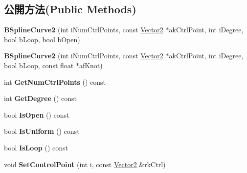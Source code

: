 \subsection*{公開方法(Public Methods)}
\begin{DoxyCompactItemize}
\item 
{\bfseries B\+Spline\+Curve2} (int i\+Num\+Ctrl\+Points, const \hyperlink{class_magnum_1_1_vector2}{Vector2} $\ast$ak\+Ctrl\+Point, int i\+Degree, bool b\+Loop, bool b\+Open)\hypertarget{class_magnum_1_1_b_spline_curve2_abb4791ad1c089a13ffb8fcb146b183be}{}\label{class_magnum_1_1_b_spline_curve2_abb4791ad1c089a13ffb8fcb146b183be}

\item 
{\bfseries B\+Spline\+Curve2} (int i\+Num\+Ctrl\+Points, const \hyperlink{class_magnum_1_1_vector2}{Vector2} $\ast$ak\+Ctrl\+Point, int i\+Degree, bool b\+Loop, const float $\ast$af\+Knot)\hypertarget{class_magnum_1_1_b_spline_curve2_aed7b4f416b57c5f6907e53eb8c702efd}{}\label{class_magnum_1_1_b_spline_curve2_aed7b4f416b57c5f6907e53eb8c702efd}

\item 
int {\bfseries Get\+Num\+Ctrl\+Points} () const \hypertarget{class_magnum_1_1_b_spline_curve2_aedea12e5c9a5103806a11dee9ab06ec9}{}\label{class_magnum_1_1_b_spline_curve2_aedea12e5c9a5103806a11dee9ab06ec9}

\item 
int {\bfseries Get\+Degree} () const \hypertarget{class_magnum_1_1_b_spline_curve2_a51881d017cd8c1a1543fb0d31e92be3d}{}\label{class_magnum_1_1_b_spline_curve2_a51881d017cd8c1a1543fb0d31e92be3d}

\item 
bool {\bfseries Is\+Open} () const \hypertarget{class_magnum_1_1_b_spline_curve2_a669313bdc592f08856cac16f5284e043}{}\label{class_magnum_1_1_b_spline_curve2_a669313bdc592f08856cac16f5284e043}

\item 
bool {\bfseries Is\+Uniform} () const \hypertarget{class_magnum_1_1_b_spline_curve2_a54b7775949532dac5baa641039dcb378}{}\label{class_magnum_1_1_b_spline_curve2_a54b7775949532dac5baa641039dcb378}

\item 
bool {\bfseries Is\+Loop} () const \hypertarget{class_magnum_1_1_b_spline_curve2_aa24bddc305d3cb662c36099b17c313fb}{}\label{class_magnum_1_1_b_spline_curve2_aa24bddc305d3cb662c36099b17c313fb}

\item 
void {\bfseries Set\+Control\+Point} (int i, const \hyperlink{class_magnum_1_1_vector2}{Vector2} \&rk\+Ctrl)\hypertarget{class_magnum_1_1_b_spline_curve2_ae3ffe88b82b8d2ce07edc20e0b5421d5}{}\label{class_magnum_1_1_b_spline_curve2_ae3ffe88b82b8d2ce07edc20e0b5421d5}


\end{DoxyCompactItemize}
